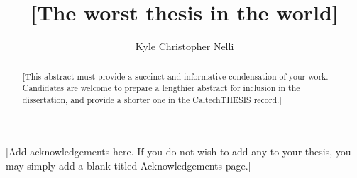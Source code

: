 \documentclass[12pt]{caltech_thesis}
\begin{document}
\title{[The worst thesis in the world]}
\author{Kyle Christopher Nelli}

\address{Pasadena, California}                     %



\maketitle[logo]

\begin{acknowledgements}
   [Add acknowledgements here. If you do not wish to add any to your thesis, you may simply add a blank titled Acknowledgements page.]
\end{acknowledgements}

\begin{abstract}
   [This abstract must provide a succinct and informative condensation of your work. Candidates are welcome to prepare a lengthier abstract for inclusion in the dissertation, and provide a shorter one in the CaltechTHESIS record.]
\end{abstract}



\begin{publishedcontent}%
\nocite{Cahn:etal:2015,Cahn:etal:2016}
\end{publishedcontent}
\end{document}
